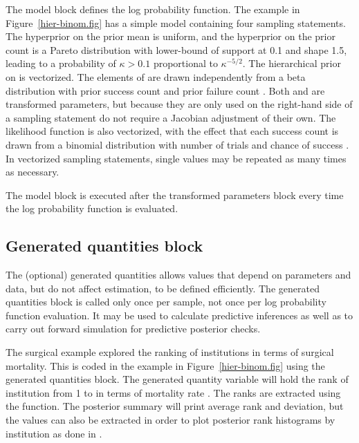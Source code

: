 \documentclass[article]{jss}
\begin{document}
The model block defines the log probability function.  The example in
Figure~\ref{hier-binom.fig} has a simple model containing four
sampling statements.  The hyperprior on the prior mean 
is uniform, and the hyperprior on the prior count  is a
Pareto distribution with lower-bound of support at 0.1 and shape 1.5,
leading to a probability of $\kappa > 0.1$ proportional to
$\kappa^{-5/2}$.  The hierarchical prior on  is
vectorized.  The elements of  are drawn independently from
a beta distribution with prior success count  and prior
failure count .  Both  and  are
transformed parameters, but because they are only used on the
right-hand side of a sampling statement do not require a Jacobian
adjustment of their own.  The likelihood function is also vectorized,
with the effect that each success count  is drawn from a
binomial distribution with number of trials  and chance of
success .  In vectorized sampling statements, single
values may be repeated as many times as necessary.  

The model block is executed after the transformed parameters block
every time the log probability function is evaluated.  

\subsection{Generated quantities block}

The (optional) generated quantities allows values that depend on
parameters and data, but do not affect estimation, to be defined
efficiently.  The generated quantities block is called only once per
sample, not once per log probability function evaluation.  It may be
used to calculate predictive inferences as well as to carry out
forward simulation for predictive posterior checks.

The  surgical example explored the ranking of
institutions in terms of surgical mortality.  This is coded in the
example in Figure~\ref{hier-binom.fig} using the generated quantities
block.  The generated quantity variable  will hold the
rank of institution  from 1 to  in terms of mortality
rate .  The ranks are extracted using the 
function. The posterior summary will print average rank and deviation,
but the values can also be extracted in order to plot posterior rank
histograms by institution as done in \citep[Examples, Volume
1]{LunnEtAl:2000,LunnEtAl:2009}.  
\end{document}
